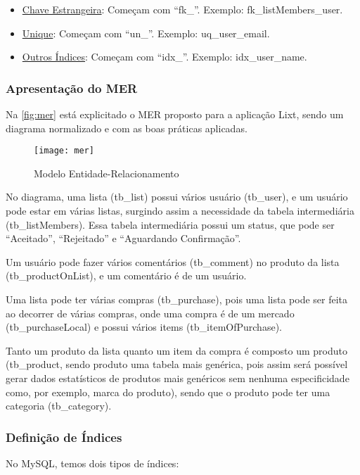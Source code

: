 \begin{itemize}
	\item \underline{Chave Estrangeira}: Começam com ``fk\_''. Exemplo: fk\_listMembers\_user. 
	\item \underline{Unique}: Começam com ``un\_''. Exemplo: uq\_user\_email.
	\item \underline{Outros Índices}: Começam com ``idx\_''. Exemplo: idx\_user\_name. 
\end{itemize}


\subsubsection{Apresentação do MER}

Na \autoref{fig:mer} está explicitado o MER proposto para a aplicação Lixt, sendo um diagrama normalizado e com as boas práticas aplicadas.

\begin{figure}[H]
  \centering
  \caption{Modelo Entidade-Relacionamento}
  \label{fig:mer}
  \texttt{[image: mer]}
\end{figure}

No diagrama, uma lista (tb\_list) possui vários usuário (tb\_user), e um usuário pode estar em várias listas, surgindo assim a necessidade da tabela intermediária (tb\_listMembers). Essa tabela intermediária possui um status, que pode ser ``Aceitado'', ``Rejeitado'' e ``Aguardando Confirmação''.

Um usuário pode fazer vários comentários (tb\_comment) no produto da lista (tb\_productOnList), e um comentário é de um usuário.

Uma lista pode ter várias compras (tb\_purchase), pois uma lista pode ser feita ao decorrer de várias compras, onde uma compra é de um mercado (tb\_purchaseLocal) e possui vários items (tb\_itemOfPurchase).

Tanto um produto da lista quanto um item da compra é 
composto um produto (tb\_product, sendo produto uma tabela mais genérica, pois assim será possível gerar dados estatísticos de produtos mais genéricos sem nenhuma especificidade como, por exemplo, marca do produto), sendo que o produto pode ter uma categoria (tb\_category).

\subsubsection{Definição de Índices}

No MySQL, temos dois tipos de índices:

